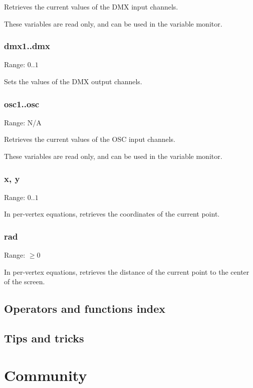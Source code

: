 \documentclass[11pt, a5paper, pagesize]{scrbook}
\begin{document}
Retrieves the current values of the DMX input channels.

These variables are read only, and can be used in the variable monitor.

\subsection{dmx1..dmx\ndmx}
Range: $0..1$

Sets the values of the DMX output channels.

\subsection{osc1..osc\nosc}
Range: N/A

Retrieves the current values of the OSC input channels.

These variables are read only, and can be used in the variable monitor.

\subsection{x, y}
Range: $0..1$

In per-vertex equations, retrieves the coordinates of the current point.

\subsection{rad}
Range: $\geq 0$

In per-vertex equations, retrieves the distance of the current point to the center of the screen.

\section{Operators and functions index}

\section{Tips and tricks}

\chapter{Community}
\end{document}
